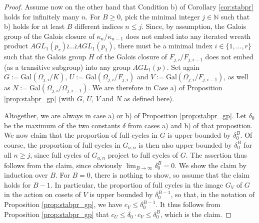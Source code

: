 \documentclass[10pt,a4paper]{amsart}
\begin{document}
\begin{proof}
Assume now on the other hand that Condition b) of Corollary \ref{cor:stabpr} holds for infinitely many $n$. For $B\ge 0$, pick the minimal integer $j\in \mathbb{N}$ such that b) holds for at least $B$ different indices $n\le j$. Since, by assumption, the Galois group of the Galois closure of $\kappa_n/\kappa_{n-1}$ does not embed into  any iterated wreath product $AGL_1(p_r)\wr\dots \wr AGL_1(p_1)$, there must be a minimal index $i\in \{1,\dots, r\}$ such that the Galois group $H$ of the Galois closure of $F_{j,i}/F_{j,i-1}$ does not embed (as a transitive subgroup) into any group $AGL_1(p)$.  Set again $G:=\textrm{Gal}(\Omega_{j,i}/K)$, $U:=\textrm{Gal}(\Omega_{j,i}/F_{j,i})$ and $V:=\textrm{Gal}(\Omega_{j,i}/F_{j,i-1})$, as well as $N:=\mathrm{Gal}(\Omega_{j,i}/\Omega_{j,i-1})$. We are therefore in Case a) of Proposition \ref{prop:stabpr_gp} (with $G$, $U$, $V$ and $N$ as defined here).


Altogether, we are always in case a) or b) of Proposition \ref{prop:stabpr_gp}.
Let $\delta_0$ be the maximum of the two constants $\delta$ from cases a) and b) of that proposition. 
We now claim that the proportion of full cycles in $G$ is upper bounded by $\delta_0^B$. Of course, the proportion of full cycles in $G_{a,n}$ is then also upper bounded by $\delta_0^B$ for all $n\ge j$, since full cycles of $G_{a,n}$ project to full cycles of $G$. The assertion thus follows from the claim, since obviously $\lim_{B\to \infty}\delta_0^B = 0$. We show the claim by induction over $B$. For $B=0$, there is nothing to show, so assume that the claim holds for $B-1$. In particular, the proportion of full cycles in the image $G_V$ of $G$ in the action on cosets of $V$ is upper bounded by $\delta_0^{B-1}$, so that, in the notation of Proposition \ref{prop:stabpr_gp}, we have $c_V\le \delta_0^{B-1}$. 
It thus follows from Proposition \ref{prop:stabpr_gp} that $c_U\le \delta_0\cdot c_V\le \delta_0^B$, which is the claim.
  \end{proof}
\end{document}
